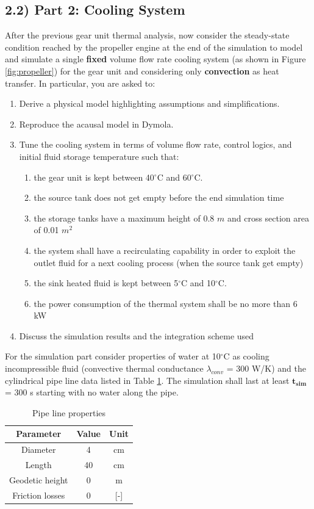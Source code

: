 \documentclass[11pt,a4paper,oneside]{article}
\begin{document}
\subsection*{2.2) Part 2: Cooling System}
After the previous gear unit thermal analysis, now consider the steady-state condition reached by the propeller engine at the end of the simulation to model and simulate a single \textbf{fixed} volume flow rate cooling system (as shown in Figure \ref{fig:propeller}) for the gear unit and considering only \textbf{convection} as heat transfer. In particular, you are asked to:

\begin{enumerate}
    \item Derive a physical model highlighting assumptions and simplifications.
    \item Reproduce the acausal model in Dymola.
    \item Tune the cooling system in terms of volume flow rate, control logics, and initial fluid storage temperature such that:
    \begin{enumerate}
        \item the gear unit is kept between 40$^{\circ}$C and 60$^{\circ}$C.
        \item the source tank does not get empty before the end simulation time
        \item the storage tanks have a maximum height of 0.8 $m$ and cross section area of 0.01 $m^2$
        \item the system shall have a recirculating capability in order to exploit the outlet fluid for a next cooling process (when the source tank get empty)
        \item the sink heated fluid is kept between 5$^{\circ}$C and 10$^{\circ}$C.
        \item the power consumption of the thermal system shall be no more than 6 kW 
    \end{enumerate}
    \item Discuss the simulation results and the integration scheme used
\end{enumerate}

For the simulation part consider properties of water at 10$^{\circ}$C as cooling incompressible fluid (convective thermal conductance $\lambda_{conv}$ = 300 W/K) and the cylindrical pipe line data listed in Table \ref{tab:pipe}.
The simulation shall last at least $\mathbf{t_{sim}}$ = 300 s starting with no water along the pipe.

\begin{table}[ht!]
    \centering
    \caption{Pipe line properties}
    \begin{tabular}{ |c|c|c| } 
        \hline
        \textbf{Parameter} & \textbf{Value} & \textbf{Unit}\\
        \hline
        Diameter & 4 & cm  \\ 
        Length & 40 & cm  \\ 
        Geodetic height & 0 & m \\
        Friction losses & 0 & [-] \\ 
        \hline
    \end{tabular}
    \label{tab:pipe}
\end{table}
\end{document}
